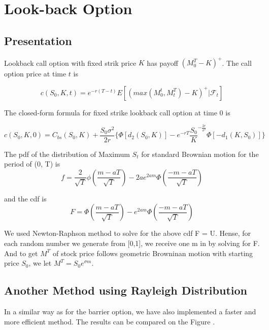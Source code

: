 \documentclass[11pt,a4paper,fleqn,draft]{article}
\begin{document}
\section{Look-back Option}
\subsection{Presentation}
Lookback call option with fixed strik price $K$ has payoff $(M^T_{0}-K)^+$. The call option price at time $t$ is

$$c(S_0,K,t) = e^{-r(T-t)}E[(max(M^t_0,M^T_t)-K)^+|\mathcal{F}_t] $$

The closed-form formula for fixed strike lookback call option at time 0 \cite{lectures, exooptions} is

$$c(S_0,K,0)=C_{bs}(S_0,K) + \frac{S_0\sigma^2}{2r}\{ \Phi[d_2(S_0,K)]-e^{-rT}\frac{S_0}{K}^{-\frac{2r}{\sigma^2}} \Phi[-d_1(K,S_0)]\}$$


The pdf of the distribution of Maximum $S_t$ for standard Brownian motion for the period of (0, T) is
$$f = \frac{2}{\sqrt{T}}\phi\left(\frac{m-aT}{\sqrt{T}}\right)-2ae^{2am}\Phi\left(\frac{-m-aT}{\sqrt{T}}\right)$$

and the cdf is
$$F = \Phi\left(\frac{m-aT}{\sqrt{T}}\right)-e^{2am}\Phi\left(\frac{-m-aT}{\sqrt{T}}\right)$$

We used Newton-Raphson method to solve for the above cdf F = U. Hense, for each random number we generate from [0,1], we receive one m in by solving for F. And to get $M^T$ of stock price follows geometric Browninan motion with starting price $S_0$, we let $M^T=S_0e^{\sigma m }$.\\


\subsection{Another Method using Rayleigh Distribution}
 In a similar way as for the barrier option, we have also implemented a faster and more efficient method. The results can be compared on the Figure \cite{fig:lboptiongraphs}.\\
\end{document}
